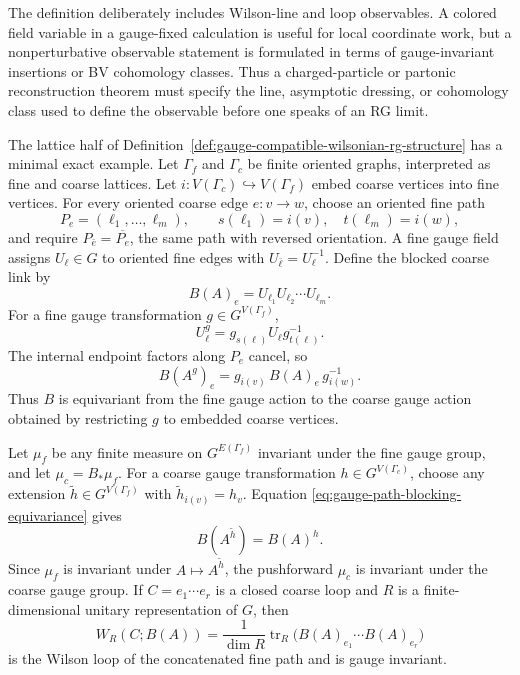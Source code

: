 The definition deliberately includes Wilson-line and loop observables.  A
colored field variable in a gauge-fixed calculation is useful for local
coordinate work, but a nonperturbative observable statement is formulated in
terms of gauge-invariant insertions or BV cohomology classes.  Thus a
charged-particle or partonic reconstruction theorem must specify the line,
asymptotic dressing, or cohomology class used to define the observable before
one speaks of an RG limit.

\begin{construction}
\label{constr:gauge-equivariant-path-blocking-rg}
The lattice half of Definition~\ref{def:gauge-compatible-wilsonian-rg-structure}
has a minimal exact example.  Let \(\Gamma_f\) and \(\Gamma_c\) be finite
oriented graphs, interpreted as fine and coarse lattices.  Let
\(i:V(\Gamma_c)\hookrightarrow V(\Gamma_f)\) embed coarse vertices into fine
vertices.  For every oriented coarse edge \(e:v\to w\), choose an oriented
fine path
\[
  P_e=(\ell_1,\ldots,\ell_m),
  \qquad
  s(\ell_1)=i(v),\quad t(\ell_m)=i(w),
\]
and require \(P_{\bar e}=\overline{P_e}\), the same path with reversed
orientation.  A fine gauge field assigns \(U_\ell\in G\) to oriented fine
edges with \(U_{\bar\ell}=U_\ell^{-1}\).  Define the blocked coarse link by
\begin{equation}
  B(A)_e
  =
  U_{\ell_1}U_{\ell_2}\cdots U_{\ell_m}.
  \label{eq:gauge-path-blocked-link}
\end{equation}
For a fine gauge transformation \(g\in G^{V(\Gamma_f)}\),
\[
  U_\ell^g=g_{s(\ell)}U_\ell g_{t(\ell)}^{-1}.
\]
The internal endpoint factors along \(P_e\) cancel, so
\begin{equation}
  B(A^g)_e
  =
  g_{i(v)}\,B(A)_e\,g_{i(w)}^{-1}.
  \label{eq:gauge-path-blocking-equivariance}
\end{equation}
Thus \(B\) is equivariant from the fine gauge action to the coarse gauge
action obtained by restricting \(g\) to embedded coarse vertices.

Let \(\mu_f\) be any finite measure on \(G^{E(\Gamma_f)}\) invariant under
the fine gauge group, and let \(\mu_c=B_\ast\mu_f\).  For a coarse gauge
transformation \(h\in G^{V(\Gamma_c)}\), choose any extension
\(\tilde h\in G^{V(\Gamma_f)}\) with
\(\tilde h_{i(v)}=h_v\).  Equation
\eqref{eq:gauge-path-blocking-equivariance} gives
\[
  B(A^{\tilde h})=B(A)^h .
\]
Since \(\mu_f\) is invariant under \(A\mapsto A^{\tilde h}\), the
pushforward \(\mu_c\) is invariant under the coarse gauge group.  If
\(C=e_1\cdots e_r\) is a closed coarse loop and \(R\) is a finite-dimensional
unitary representation of \(G\), then
\begin{equation}
  W_R(C;B(A))
  =
  \frac{1}{\dim R}
  \operatorname{tr}_R
  \bigl(B(A)_{e_1}\cdots B(A)_{e_r}\bigr)
  \label{eq:gauge-path-blocked-wilson-loop}
\end{equation}
is the Wilson loop of the concatenated fine path and is gauge invariant.


\end{construction}
